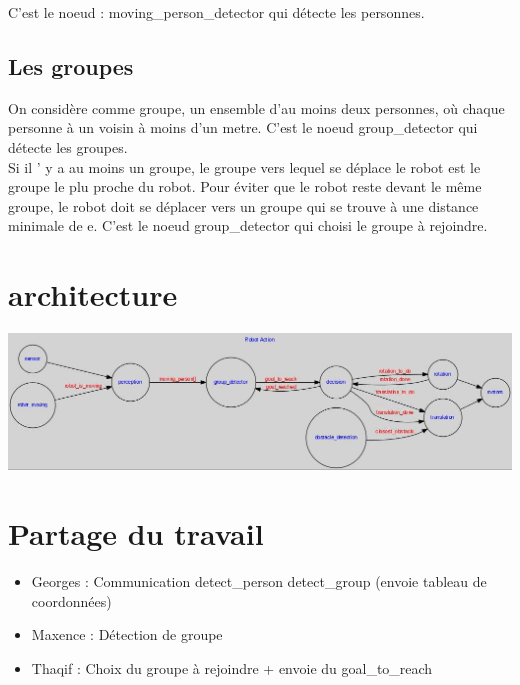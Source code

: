 \documentclass{report}
\begin{document}
C'est le noeud : moving\_person\_detector qui d\'etecte les personnes.

\subsection{Les groupes}

On consid\`ere comme groupe, un ensemble d'au moins deux personnes, o\`u chaque
personne \`a un voisin \`a moins d'un metre. C'est le noeud group\_detector qui
d\'etecte les groupes.\\
Si il ' y a au moins un groupe, le groupe vers lequel se d\'eplace le robot est
le groupe le plu proche du robot. Pour \'eviter que le robot reste devant le
m\^eme groupe, le robot doit se d\'eplacer vers un groupe qui se trouve \`a une
distance minimale de e. C'est le noeud group\_detector qui choisi le
groupe \`a rejoindre.

\section{architecture}

\begin{center}
\includegraphics[scale=0.6]{automata.jpg}
\end{center}

\section{Partage du travail}

\begin{itemize}
\item Georges : Communication detect\_person detect\_group (envoie tableau
  de coordonn\'ees)
\item Maxence : D\'etection de groupe
  \item Thaqif : Choix du groupe \`a rejoindre + envoie du goal\_to\_reach
\end{itemize}
\end{document}
